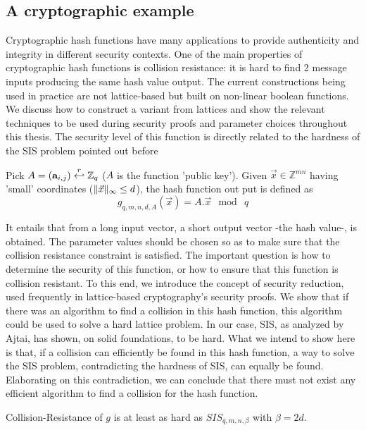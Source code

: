 \subsection{A cryptographic example}
\label{sec:ajtaiHash}
Cryptographic hash functions have many applications to
provide authenticity and integrity in different security contexts. One of the main properties of cryptographic
hash functions is collision resistance: it is hard to find 2 message inputs
producing the same hash value output. The current constructions being used in practice
are not lattice-based but built on non-linear boolean functions. We discuss how
to construct a variant from lattices and show the relevant techniques
to be used during security proofs and parameter choices throughout this
thesis. The security level of this function is directly related to the hardness of
the SIS problem pointed out before
\begin{definition}
  Pick $A=(\mathbf{a}_{i,j}) \stackrel{r}{\hookleftarrow} \mathbb{Z}_q$ ($A$ is the function
  'public key'). Given $\vec{x} \in \mathbb{Z}^{mn}$ having 'small' coordinates
  ($\Vert \vec{x} \Vert_{\infty} \leq d$), the hash function out put is defined as
  \[
    g_{q,m,n,d,A}(\vec{x}) = A . \vec{x} \mod \ q
  \]
  \label{def:Ajtai's Hash Function}
\end{definition}
It entails that from a long input vector, a short output vector -the hash value-, is obtained. The parameter values should be chosen so as to make sure that the collision resistance constraint is
satisfied. The important question is how to determine the security of this
function, or how to ensure that this function is collision resistant. To this end, we
introduce the concept of security reduction, used frequently in
lattice-based cryptography's security proofs. We show that if there
was an algorithm to find a collision in this hash function, this algorithm could be used
to solve a hard lattice problem. In our case, SIS, as
analyzed by Ajtai, has shown, on solid foundations, to be hard. What we
intend to show here is that, if a collision can efficiently be found in this hash
function, a way to solve the SIS problem, contradicting the hardness of SIS, can equally be found. Elaborating on this contradiction, we can conclude that there must not exist any efficient algorithm to find a collision for the hash function.
\begin{theorem}
  Collision-Resistance of $g$ is at least as hard as $SIS_{q,m,n,\beta}$ with
  $\beta = 2d$.
  \label{the:ajtai hash}
\end{theorem}
